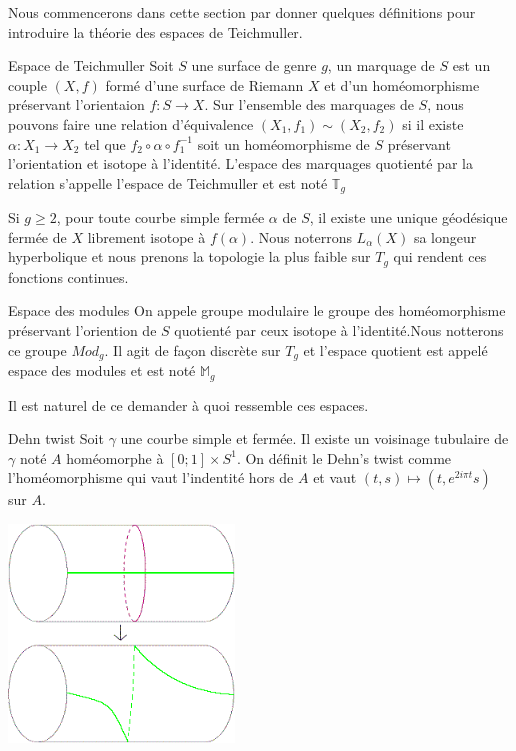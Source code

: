 Nous commencerons dans cette section par donner quelques définitions pour introduire la théorie des espaces de Teichmuller.

\begin{dfnt}{Espace de Teichmuller}
Soit $S$ une surface de genre $g$, un marquage de $S$ est un couple $(X,f)$ formé d'une surface de Riemann $X$ et d'un homéomorphisme préservant l'orientaion $f:S \to X$.
Sur l'ensemble des marquages de $S$, nous pouvons faire une relation d'équivalence $(X_1,f_1) \sim (X_2,f_2)$ si il existe $\alpha : X_1 \to X_2 $ tel que $f_2 \circ \alpha \circ f_1^{-1}$ soit un homéomorphisme de $S$ préservant l'orientation et isotope à l'identité.
L'espace des marquages quotienté par la relation s'appelle l'espace de Teichmuller et est noté $\mathbb{T}_g$
\end{dfnt}

\begin{rmq}
Si $g \geq 2$, pour toute courbe simple fermée $\alpha$ de $S$, il existe une unique géodésique fermée de $X$ librement isotope à $f(\alpha)$. Nous noterrons $L_{\alpha}(X)$ sa longeur hyperbolique et nous prenons la topologie la plus faible sur $T_g$ qui rendent ces fonctions continues.
\end{rmq}

\begin{dfnt}{Espace des modules}
On appele groupe modulaire le groupe des homéomorphisme préservant l'oriention de $S$ quotienté par ceux isotope à l'identité.Nous notterons ce groupe $Mod_g$.
Il agit de façon discrète sur $T_g$ et l'espace quotient est appelé espace des modules et est noté $\mathbb{M}_g$
\end{dfnt}

Il est naturel de ce demander à quoi ressemble ces espaces.

\begin{dfnt}{Dehn twist}
Soit $\gamma$ une courbe simple et fermée. Il existe un voisinage tubulaire de $\gamma$ noté $A$ homéomorphe à $[0;1] \times S^{1}$.
On définit le Dehn's twist comme l'homéomorphisme qui vaut l'indentité hors de $A$ et vaut $(t,s) \mapsto (t,e^{2i \pi t} s)$ sur $A$.
\end{dfnt}

\includegraphics[width=6cm]{Image/Dehn_twist.png}

